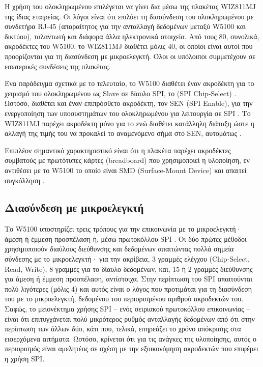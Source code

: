 

Η χρήση του ολοκληρωμένου επιλέγεται να γίνει δια μέσω της πλακέτας WIZ811MJ της
ίδιας εταιρείας. Οι λόγοι είναι ότι επιλύει τη διασύνδεση του ολοκληρωμένου με
συνδετήρα RJ-45 (απαραίτητος για την ανταλλαγή δεδομένων μεταξύ W5100 και
δικτύου), ταλαντωτή και διάφορα άλλα ηλεκτρονικά στοιχεία. Από τους 80,
συνολικά, ακροδέκτες του W5100, το WIZ811MJ διαθέτει μόλις 40, οι οποίοι είναι
αυτοί που προορίζονται για τη διασύνδεση με μικροελεγκτή. Όλοι οι υπόλοιποι
συμμετέχουν σε εσωτερικές συνδέσεις της πλακέτας.

Ένα παράδειγμα σχετικά με το τελευταίο, το W5100 διαθέτει έναν ακροδέκτη για το
χειρισμό του ολοκληρωμένου ως Slave σε δίαυλο SPI, το 
(\textenglish{SPI Chip-Select}) \parencite[9]{wiz11:w5100}. Ωστόσο, διαθέτει και
έναν επιπρόσθετο ακροδέκτη, τον SEN (\textenglish{SPI Enable}), για την
ενεργοποίηση των υποσυστημάτων του ολοκληρωμένου για λειτουργία σε SPI
\parencite[8]{wiz11:w5100}. Το WIZ811MJ παρέχει ακροδέκτη μόνο για το 
ενώ διαθέτει κατάλληλη διάταξη ώστε η αλλαγή της τιμής του να προκαλεί το
αναμενόμενο σήμα στο SEN, αυτομάτως \parencite[7]{wiz13:811mj}.

Επιπλέον σημαντικό χαρακτηριστικό είναι ότι η πλακέτα παρέχει ακροδέκτες
συμβατούς με πρωτότυπες κάρτες (\textenglish{breadboard}) που χρησιμοποιεί η
υλοποίηση, εν αντιθέσει με το W5100 το οποίο είναι SMD
(\textenglish{Surface-Mount Device}) και απαιτεί συγκόλληση
\parencite[6,12]{wiz13:811mj}.


\subsection{Διασύνδεση με μικροελεγκτή}

Το W5100 υποστηρίζει τρεις τρόπους για την επικοινωνία με το μικροελεγκτή· άμεση
ή έμμεση προσπέλαση ή, μέσω πρωτοκόλλου SPI \parencite[59]{wiz11:w5100}. Οι δύο
πρώτες μέθοδοι χρησιμοποιούν διαύλους διεύθυνσης και δεδομένων απαιτώντας πολλά
σημεία σύνδεσης με το μικροελεγκτή· για την ακρίβεια, 3 γραμμές ελέγχου
(\textenglish{Chip-Select, Read, Write}), 8 γραμμές για το δίαυλο δεδομένων,
και, 15 ή 2 γραμμές διεύθυνσης για άμεση ή έμμεση προσπέλαση, αντίστοιχα. Στην
περίπτωση του SPI απαιτούνται πολύ λιγότερες (μόλις 4) και αυτός είναι ο λόγος
που προτιμάται για τη διασύνδεση του με το μικροελεγκτή, δεδομένου του
περιορισμένου αριθμού ακροδεκτών του.
Σαφώς, το μειονέκτημα χρήσης SPI -- ενός σειριακού
πρωτοκόλλου επικοινωνίας -- είναι ότι επιτυγχάνεται πολύ μικρότερος ρυθμός
ανταλλαγής δεδομένων από ότι στην περίπτωση των άλλων δύο, κάτι που, τελικά,
επηρεάζει το χρόνο απόκρισης στα εισερχόμενα αιτήματα. Ωστόσο, κρίνεται ότι για
τις ανάγκες της υλοποίησης, αυτός ο περιορισμός είναι αμελητέος σε σχέση με την
εξοικονόμηση ακροδεκτών που επιφέρει η χρήση SPI.

